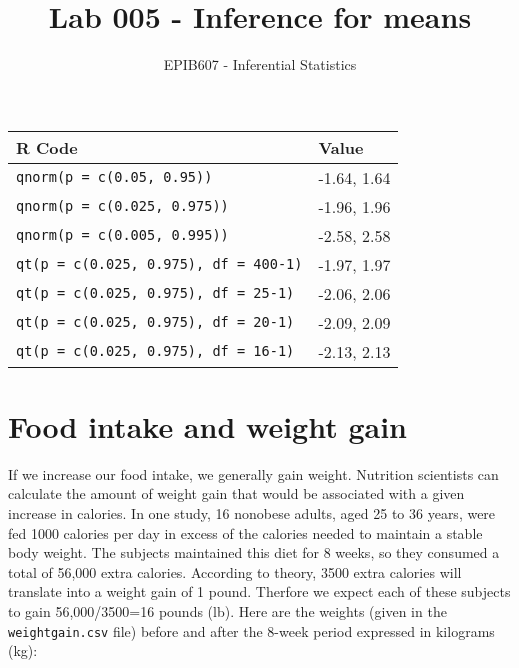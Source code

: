 \documentclass[letterpaper,11pt,twoside,]{pinp}
\title{Lab 005 - Inference for means}
\author[a]{EPIB607 - Inferential Statistics}
\affil[a]{McGill University}
\begin{document}
\verticaladjustment{-2pt}

\maketitle
\thispagestyle{firststyle}



\begin{longtable}[]{@{}ll@{}}
\toprule
R Code & Value \\
\midrule
\endhead
\texttt{qnorm(p\ =\ c(0.05,\ 0.95))} & -1.64, 1.64 \\
\texttt{qnorm(p\ =\ c(0.025,\ 0.975))} & -1.96, 1.96 \\
\texttt{qnorm(p\ =\ c(0.005,\ 0.995))} & -2.58, 2.58 \\
\texttt{qt(p\ =\ c(0.025,\ 0.975),\ df\ =\ 400-1)} & -1.97, 1.97 \\
\texttt{qt(p\ =\ c(0.025,\ 0.975),\ df\ =\ 25-1)} & -2.06, 2.06 \\
\texttt{qt(p\ =\ c(0.025,\ 0.975),\ df\ =\ 20-1)} & -2.09, 2.09 \\
\texttt{qt(p\ =\ c(0.025,\ 0.975),\ df\ =\ 16-1)} & -2.13, 2.13 \\
\bottomrule
\end{longtable}

\hypertarget{food-intake-and-weight-gain}{%
\section{Food intake and weight
gain}\label{food-intake-and-weight-gain}}

If we increase our food intake, we generally gain weight. Nutrition
scientists can calculate the amount of weight gain that would be
associated with a given increase in calories. In one study, 16 nonobese
adults, aged 25 to 36 years, were fed 1000 calories per day in excess of
the calories needed to maintain a stable body weight. The subjects
maintained this diet for 8 weeks, so they consumed a total of 56,000
extra calories. According to theory, 3500 extra calories will translate
into a weight gain of 1 pound. Therfore we expect each of these subjects
to gain 56,000/3500=16 pounds (lb). Here are the weights (given in the
\texttt{weightgain.csv} file) before and after the 8-week period
expressed in kilograms (kg):
\end{document}
